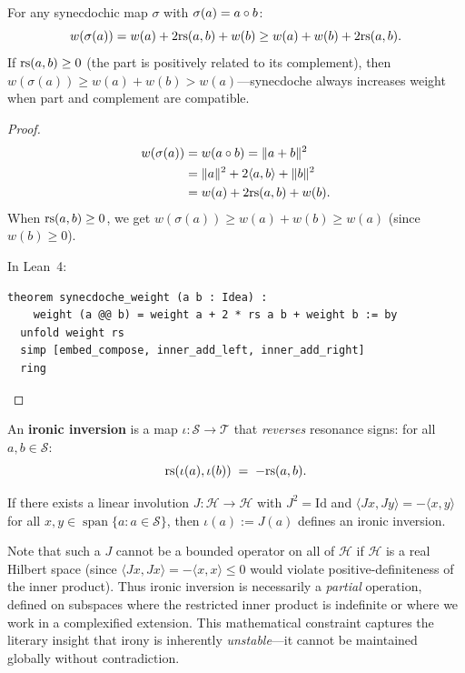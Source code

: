 \begin{theorem}
\label{thm:synecdoche-weight}
For any synecdochic map $\sigma$ with $\sigma(a) = a \circ b$:
\[
  w(\sigma(a)) = w(a) + 2\mathrm{rs}(a, b) + w(b) \geq w(a) + w(b) + 2\mathrm{rs}(a, b).
\]
If $\mathrm{rs}(a, b) \geq 0$ (the part is positively related to its complement),
then $w(\sigma(a)) \geq w(a) + w(b) > w(a)$---synecdoche always increases
weight when part and complement are compatible.
\end{theorem}

\begin{proof}
\begin{align*}
  w(\sigma(a)) &= w(a \circ b)
  = \|a + b\|^2 \\
  &= \|a\|^2 + 2\langle a, b \rangle + \|b\|^2 \\
  &= w(a) + 2\mathrm{rs}(a, b) + w(b).
\end{align*}
When $\mathrm{rs}(a, b) \geq 0$, we get $w(\sigma(a)) \geq w(a) + w(b) \geq w(a)$
(since $w(b) \geq 0$).

In Lean~4:
\begin{lstlisting}
theorem synecdoche_weight (a b : Idea) :
    weight (a @@ b) = weight a + 2 * rs a b + weight b := by
  unfold weight rs
  simp [embed_compose, inner_add_left, inner_add_right]
  ring
\end{lstlisting}
\end{proof}

\begin{definition}
\label{def:irony}
An \textbf{ironic inversion} is a map $\iota: \mathcal{S} \to \mathcal{T}$
that \emph{reverses} resonance signs: for all $a, b \in \mathcal{S}$:
\[
  \mathrm{rs}(\iota(a), \iota(b)) \;=\; -\mathrm{rs}(a, b).
\]
\end{definition}

\begin{theorem}
\label{thm:irony-negation}
If there exists a linear involution $J: \mathcal{H} \to \mathcal{H}$ with
$J^2 = \mathrm{Id}$ and $\langle Jx, Jy \rangle = -\langle x, y \rangle$ for all
$x, y \in \operatorname{span}\{a : a \in \mathcal{S}\}$, then
$\iota(a) := J(a)$ defines an ironic inversion.

Note that such a $J$ cannot be a bounded operator on all of $\mathcal{H}$ if
$\mathcal{H}$ is a real Hilbert space (since $\langle Jx, Jx \rangle = -\langle x, x \rangle \leq 0$
would violate positive-definiteness of the inner product).  Thus ironic
inversion is necessarily a \emph{partial} operation, defined on subspaces
where the restricted inner product is indefinite or where we work in a
complexified extension.  This mathematical constraint captures the literary
insight that irony is inherently \emph{unstable}---it cannot be maintained
globally without contradiction.
\end{theorem}

